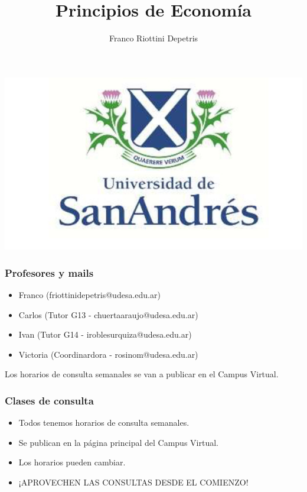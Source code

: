 \documentclass{beamer}
\title[Principios de Economía]{Principios de Economía}
\date{}
\author[Riottini]{Franco Riottini Depetris}
\institute[]{Universidad de San Andrés \\
2025}
\begin{document}
\begin{frame}
    \titlepage
    \centering
    \includegraphics[scale=0.25]{../Figures/logoUDESA.jpg} 

\end{frame}

\begin{frame}
\frametitle{Profesores y mails}
\begin{itemize}
    \item Franco (friottinidepetris@udesa.edu.ar)
    \item Carlos (Tutor G13 - chuertaaraujo@udesa.edu.ar)
    \item Ivan (Tutor G14 - iroblesurquiza@udesa.edu.ar)
    \item Victoria (Coordinardora - rosinom@udesa.edu.ar)
\end{itemize}
Los horarios de consulta semanales se van a publicar en el Campus Virtual.
\end{frame}

\begin{frame}
    \frametitle{Clases de consulta}
    \begin{itemize}
        \item Todos tenemos horarios de consulta semanales.
        \item Se publican en la página principal del Campus Virtual.
        \item Los horarios pueden cambiar.
        \item ¡APROVECHEN LAS CONSULTAS DESDE EL COMIENZO!
    \end{itemize}
\end{frame}
\end{document}
